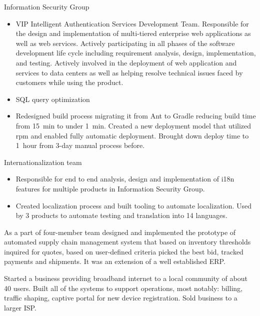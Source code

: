 \documentclass[11pt,a4paper,roman]{moderncv}       %
\begin{document}
\medskip

Information Security Group

\begin{itemize}
    \item VIP Intelligent Authentication Services Development Team. Responsible for the design and implementation of multi-tiered enterprise web applications as well as web services. Actively participating in all phases of the software development life cycle including requirement analysis, design, implementation, and testing. Actively involved in the deployment of web application and services to data centers as well as helping resolve technical issues faced by customers while using the product.
    \item SQL query optimization
    \item Redesigned build process migrating it from Ant to Gradle reducing build time from 15~min to under 1~min. Created a new deployment model that utilized rpm and enabled fully automatic deployment. Brought down deploy time to 1~hour from 3-day manual process before.
\end{itemize}

\medskip

Internationalization team

\begin{itemize}
    \item Responsible for end to end analysis, design and implementation of i18n features for multiple products in Information Security Group.
    \item Created localization process and built tooling to automate localization. Used by 3 products to automate testing and translation into 14 languages.
\end{itemize}

\bigskip


As a part of four-member team designed and implemented the prototype of automated supply chain management system that based on inventory thresholds inquired for quotes, based on user-defined criteria picked the best bid, tracked payments and shipments. It was an extension of a well established ERP.

\bigskip


Started a business providing broadband internet to a local community of about 40 users. Built all of the systems to support operations, most notably: billing, traffic shaping, captive portal for new device registration. Sold business to a larger ISP.
\end{document}
